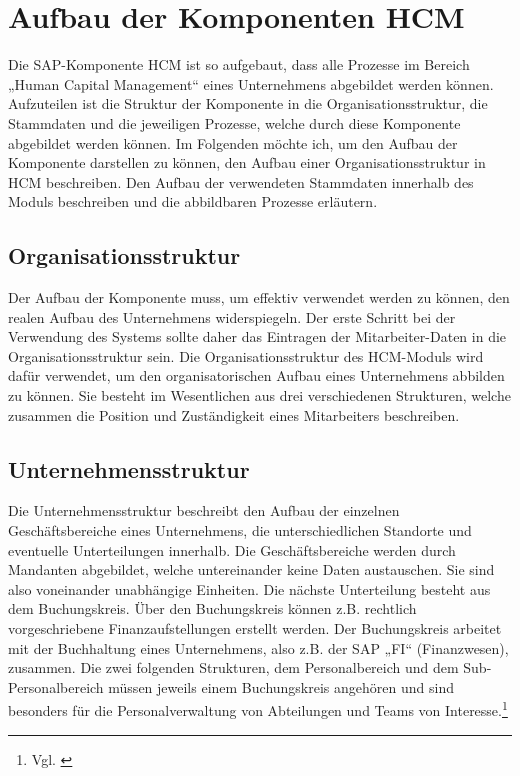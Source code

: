 
\section{Aufbau der Komponenten HCM} 
\label{sec:aufbauderkomponenten}

Die SAP-Komponente HCM ist so aufgebaut, dass alle Prozesse im Bereich „Human Capital Management“ eines Unternehmens abgebildet werden können.
Aufzuteilen ist die Struktur der Komponente in die Organisationsstruktur, die Stammdaten und die jeweiligen Prozesse, welche durch diese Komponente abgebildet werden können.
Im Folgenden möchte ich, um den Aufbau der Komponente darstellen zu können, den Aufbau einer Organisationsstruktur in HCM beschreiben.
Den Aufbau der verwendeten Stammdaten innerhalb des Moduls beschreiben und die abbildbaren Prozesse erläutern.

\subsection{Organisationsstruktur}
Der Aufbau der Komponente muss, um effektiv verwendet werden zu können, den realen Aufbau des Unternehmens widerspiegeln.
Der erste Schritt bei der Verwendung des Systems sollte daher das Eintragen der Mitarbeiter-Daten in die Organisationsstruktur sein.
Die Organisationsstruktur des HCM-Moduls wird dafür verwendet, um den organisatorischen Aufbau eines Unternehmens abbilden zu können.
Sie besteht im Wesentlichen aus drei verschiedenen Strukturen, welche zusammen die Position und Zuständigkeit eines Mitarbeiters beschreiben.

\subsection{Unternehmensstruktur}
Die Unternehmensstruktur beschreibt den Aufbau der einzelnen Geschäftsbereiche eines Unternehmens, die unterschiedlichen Standorte und eventuelle Unterteilungen innerhalb.
Die Geschäftsbereiche werden durch Mandanten abgebildet, welche untereinander keine Daten austauschen.
Sie sind also voneinander unabhängige Einheiten. Die nächste Unterteilung besteht aus dem Buchungskreis.
Über den Buchungskreis können z.B. rechtlich vorgeschriebene Finanzaufstellungen erstellt werden.
Der Buchungskreis arbeitet mit der Buchhaltung eines Unternehmens, also z.B. der SAP „FI“ (Finanzwesen), zusammen.
Die zwei folgenden Strukturen, dem Personalbereich und dem Sub-Personalbereich müssen jeweils einem Buchungskreis angehören und sind besonders für die Personalverwaltung von Abteilungen und Teams von Interesse.\footnote{Vgl. \cite{SAPSE2024a}}


